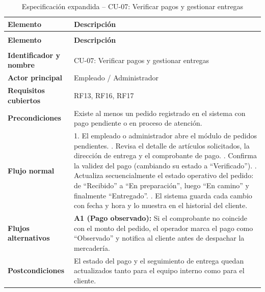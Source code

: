 {\small
\begin{xltabular}{\textwidth}{|>{\raggedright\arraybackslash}p{3.4cm}|X|}
    \caption{Especificación expandida -- CU-07: Verificar pagos y gestionar entregas}
    \label{tab:cu_expandido_entregas} \\
    \hline
    \textbf{Elemento} & \textbf{Descripción} \\
    \hline
    \endfirsthead

     \\
    \hline
    \textbf{Elemento} & \textbf{Descripción} \\
    \hline
    \endhead

     \\
    \endfoot

    \endlastfoot

    \textbf{Identificador y nombre} & CU-07: Verificar pagos y gestionar entregas \\*
    \hline
    \textbf{Actor principal} & Empleado / Administrador \\*
    \hline
    \textbf{Requisitos cubiertos} & RF13, RF16, RF17 \\*
    \hline
    \textbf{Precondiciones} & Existe al menos un pedido registrado en el sistema con pago pendiente o en proceso de atención. \\*
    \hline
    \textbf{Flujo normal} & 
    1. El empleado o administrador abre el módulo de pedidos pendientes. . Revisa el detalle de artículos solicitados, la dirección de entrega y el comprobante de pago. . Confirma la validez del pago (cambiando su estado a ``Verificado''). . Actualiza secuencialmente el estado operativo del pedido: de ``Recibido'' a ``En preparación'', luego ``En camino'' y finalmente ``Entregado''. . El sistema guarda cada cambio con fecha y hora y lo muestra en el historial del cliente. \\*
    \hline
    \textbf{Flujos alternativos} & \textbf{A1 (Pago observado):} Si el comprobante no coincide con el monto del pedido, el operador marca el pago como ``Observado'' y notifica al cliente antes de despachar la mercadería. \\*
    \hline
    \textbf{Postcondiciones} & El estado del pago y el seguimiento de entrega quedan actualizados tanto para el equipo interno como para el cliente. \\
    \hline
\end{xltabular}
}

